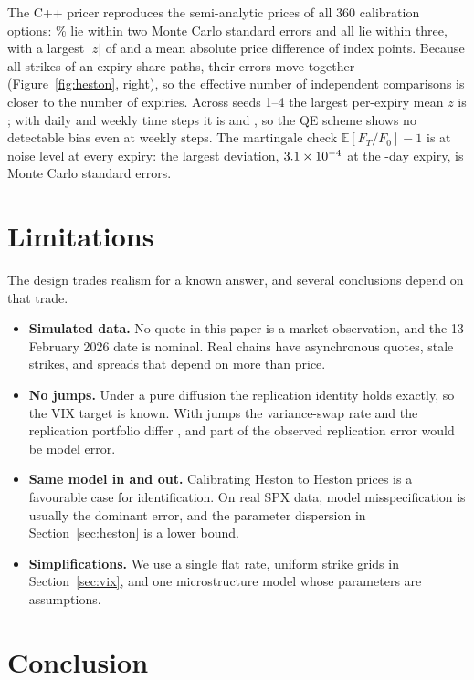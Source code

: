\documentclass[11pt]{article}
\theoremstyle{remark}
\begin{document}
The C++ pricer reproduces the semi-analytic prices of all 360 calibration options: \MCWithin\% lie within two Monte Carlo standard errors and all lie within three, with a largest $|z|$ of \MCMaxZ{} and a mean absolute price difference of \MCAbsErr{} index points.
Because all strikes of an expiry share paths, their errors move together (Figure~\ref{fig:heston}, right), so the effective number of independent comparisons is closer to the number of expiries.
Across seeds 1--4 the largest per-expiry mean $z$ is \RMCSeedMax; with daily and weekly time steps it is \RMCDaily{} and \RMCWeekly, so the QE scheme shows no detectable bias even at weekly steps.
The martingale check $\mathbb{E}[F_T/F_0] - 1$ is at noise level at every expiry: the largest deviation, $3.1\times 10^{-4}$ at the \MCMartDays-day expiry, is \MCMartZ{} Monte Carlo standard errors.

\section{Limitations}
\label{sec:limits}

The design trades realism for a known answer, and several conclusions depend on that trade.
\begin{itemize}
  \item \textbf{Simulated data.} No quote in this paper is a market observation, and the 13 February 2026 date is nominal.
  Real chains have asynchronous quotes, stale strikes, and spreads that depend on more than price.
  \item \textbf{No jumps.} Under a pure diffusion the replication identity holds exactly, so the VIX target is known.
  With jumps the variance-swap rate and the replication portfolio differ \citep{carrwu2009, jiangtian2005}, and part of the observed replication error would be model error.
  \item \textbf{Same model in and out.} Calibrating Heston to Heston prices is a favourable case for identification.
  On real SPX data, model misspecification is usually the dominant error, and the parameter dispersion in Section~\ref{sec:heston} is a lower bound.
  \item \textbf{Simplifications.} We use a single flat rate, uniform strike grids in Section~\ref{sec:vix}, and one microstructure model whose parameters are assumptions.
\end{itemize}

\section{Conclusion}
\end{document}
